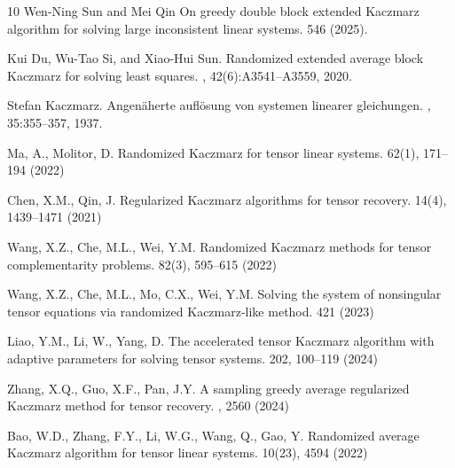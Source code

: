 \documentclass[11pt]{article}
\begin{document}
{\begin{thebibliography}{10}
Wen-Ning Sun and Mei Qin
\newblock On greedy double block extended Kaczmarz algorithm for solving
large inconsistent linear systems.
 546 (2025).


Kui Du, Wu-Tao Si, and Xiao-Hui Sun.
\newblock Randomized extended average block {K}aczmarz for solving least
  squares.
, 42(6):A3541--A3559, 2020.


Stefan Kaczmarz.
\newblock Angen\"aherte aufl\"osung von systemen linearer gleichungen.
, 35:355--357, 1937.

Ma, A., Molitor, D.
\newblock Randomized Kaczmarz for tensor linear systems. 
 62(1), 171–194 (2022)

Chen, X.M., Qin, J.
\newblock Regularized Kaczmarz algorithms for tensor recovery.
 14(4), 1439–1471 (2021)

Wang, X.Z., Che, M.L., Wei, Y.M.
\newblock Randomized Kaczmarz methods for tensor complementarity problems.  82(3), 595–615 (2022)

Wang, X.Z., Che, M.L., Mo, C.X., Wei, Y.M.
Solving the system of nonsingular tensor equations via
randomized Kaczmarz-like method. 
 421 (2023)

Liao, Y.M., Li, W., Yang, D.
\newblock The accelerated tensor Kaczmarz algorithm with adaptive parameters for solving tensor systems. 
 202, 100–119 (2024)

Zhang, X.Q., Guo, X.F., Pan, J.Y.
\newblock A sampling greedy average regularized Kaczmarz method for tensor
recovery. 
, 2560 (2024)



Bao, W.D., Zhang, F.Y., Li, W.G., Wang, Q., Gao, Y.
\newblock Randomized average Kaczmarz algorithm for
tensor linear systems. 
 10(23), 4594 (2022)


\end{thebibliography}}
\end{document}
